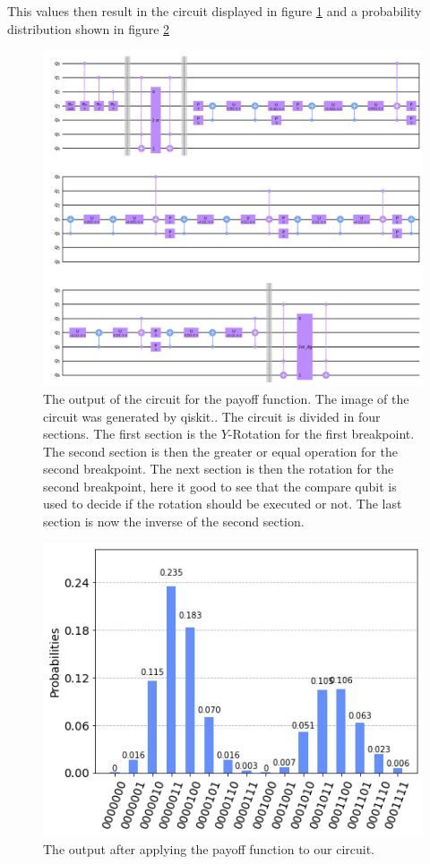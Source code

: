 \documentclass[../main.tex]{subfiles}
\begin{document}
This values then result in the circuit displayed in figure \ref{fig:E_model_payoff_function} and a probability distribution shown in figure \ref{fig:E_probability_estimate}
 
\begin{figure}[H]
  \begin{center}
    \includegraphics[width=\linewidth]{../../images/model.png}
  \end{center}
  \caption{The output of the circuit for the payoff function. The image of the circuit was generated by qiskit.\cite{Qiskit}. The circuit is divided in four sections. The first section is the $Y$-Rotation for the first breakpoint. The second section is then the greater or equal operation for the second breakpoint. The next section is then the rotation for the second breakpoint, here it good to see that the compare qubit is used to decide if the rotation should be executed or not. The last section is now the inverse of the second section.}
  \label{fig:E_model_payoff_function}
\end{figure}

 \begin{figure}[H]
  \begin{center}
    \includegraphics[width=0.5\linewidth]{../../images/probability_estimate.png}
  \end{center}
  \caption{The output after applying the payoff function to our circuit.}
  \label{fig:E_probability_estimate}
\end{figure}
\end{document}
